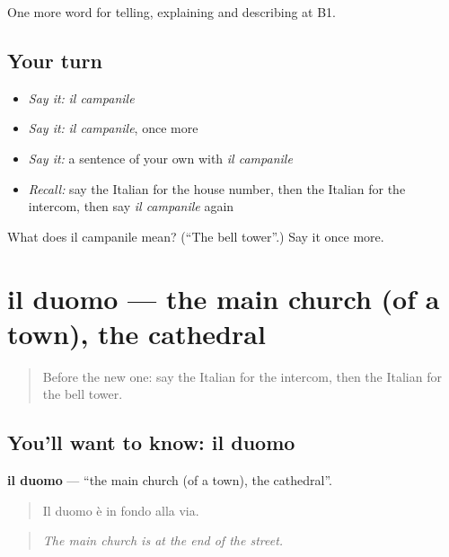 \begin{grammarlens}[title={What you've built}]
One more word for telling, explaining and describing at B1.
\end{grammarlens}

\subsection*{Your turn}
\begin{itemize}
\raggedright
  \item \emph{Say it:} \emph{il campanile}
  \item \emph{Say it:} \emph{il campanile}, once more
  \item \emph{Say it:} a sentence of your own with \emph{il campanile}
  \item \emph{Recall:} say the Italian for the house number, then the Italian for the intercom, then say \emph{il campanile} again
\end{itemize}

\begin{tcolorbox}[breakable,colback=teal!4,colframe=teal!35!black,title={Before you move on}]
What does il campanile mean? (\textquotedblleft{}The bell tower\textquotedblright{}.) Say it once more.
\end{tcolorbox}
\section[il duomo]{il duomo — the main church (of a town), the cathedral}

\label{lesson:IT-C445-duomo}



\begin{quote}
Before the new one: say the Italian for the intercom, then the Italian for the bell tower.
\end{quote}

\subsection*{You'll want to know: il duomo}
\textbf{il duomo} — \textquotedblleft{}the main church (of a town), the cathedral\textquotedblright{}.

\begin{quote}
Il duomo è in fondo alla via.
\end{quote}

\begin{quote}
\emph{The main church is at the end of the street.}
\end{quote}

